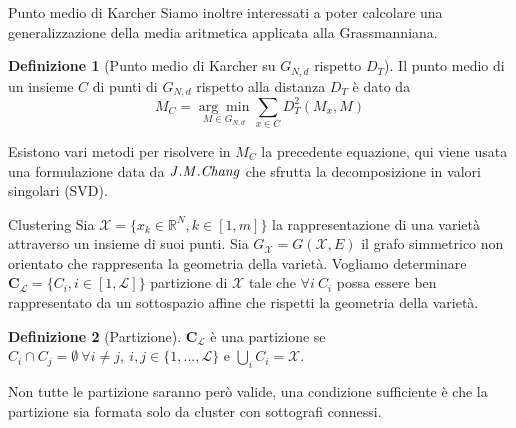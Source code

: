 \documentclass[usenames,dvipsnames,9pt]{beamer}
\newcommand{\RR}{\mathbb{R}}
\theoremstyle{definition}
\newtheorem{deff}{Definizione}
\begin{document}
\begin{frame}{Punto medio di Karcher}
Siamo inoltre interessati a poter calcolare una generalizzazione della media aritmetica applicata alla Grassmanniana.
\begin{deff}[Punto medio di Karcher su $G_{N,d}$ rispetto $D_T$]
Il punto medio di un insieme $C$ di punti di $G_{N,d}$ rispetto alla distanza $D_T$ è dato da
\begin{equation*}
M_{C}=\underset{M \in G_{N, d}}{\arg \min } \sum_{x \in C} D_{T}^{2}\left(M_{x}, M\right)
\end{equation*}
\end{deff}
Esistono vari metodi per risolvere in $M_C$ la precedente equazione, qui viene usata una formulazione data da $\it{J.M. Chang}$ che sfrutta la decomposizione in valori singolari (SVD).
\end{frame}

\begin{frame}{Clustering}
Sia $\mathcal{X} = \{x_k\in\RR^N, k\in [1, m]\}$ la rappresentazione di una varietà attraverso un insieme di suoi punti. Sia $G_{\mathcal{X}}=G(\mathcal{X}, E)$ il grafo simmetrico non orientato che rappresenta la geometria della varietà. Vogliamo determinare $\textbf{C}_{\mathcal{L}}=\{C_i, i\in [1, \mathcal{L}]\}$ partizione di $\mathcal{X}$ tale che $\forall i\ C_i$ possa essere ben rappresentato da un sottospazio affine che rispetti la geometria della varietà.
\begin{deff}[Partizione]
$\textbf{C}_{\mathcal{L}}$ è una partizione se \\ $C_i\cap C_j = \emptyset \ \forall i\neq j, \ i,j\in \{1, ..., \mathcal{L} \}$ e $\bigcup_{i} C_i = \mathcal{X}$.
\end{deff}
Non tutte le partizione saranno però valide, una condizione sufficiente è che la partizione sia formata solo da cluster con sottografi connessi.
\end{frame}
\end{document}
